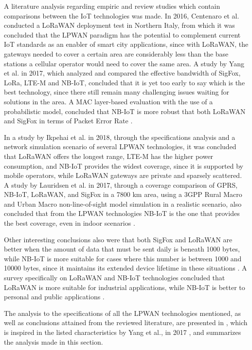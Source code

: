 A literature analysis regarding empiric and review studies which contain comparisons between the IoT technologies was made. In 2016, Centenaro et al. conducted a LoRaWAN deployment test in Northern Italy, from which it was concluded that the LPWAN paradigm has the potential to complement current IoT standards as an enabler of smart city applications, since with LoRaWAN, the gateways needed to cover
a certain area are considerably less than the base stations a cellular operator would need to cover the same area. A study by Yang et al. in 2017, which analyzed and compared the effective bandwidth of SigFox, LoRa, LTE-M and NB-IoT, concluded that it is yet too early to say which is the best technology, since there still remain many challenging issues waiting for solutions in the area. A \ac{MAC} layer-based evaluation with the use of a probabilistic model, concluded that NB-IoT is more robust that both LoRaWAN and SigFox in terms of Packet Error Rate \cite{Mroue2018}.

In a study by Ikpehai et al. in 2018, through the specifications analysis and a network simulation scenario of several LPWAN technologies, it was concluded that LoRaWAN offers the longest range, LTE-M has the higher power consumption, and NB-IoT provides the widest coverage, since it is supported by mobile operators, while LoRaWAN gateways are private and sparsely scattered. A study by Lauridsen et al. in 2017, through a coverage comparison of GPRS, NB-IoT, LoRaWAN, and SigFox in a 7800 km area, using a 3GPP Rural Macro and Urban Macro non-line-of-sight model simulation in a realistic scenario, also concluded that from the LPWAN technologies NB-IoT is the one that provides the best coverage, even in indoor scenarios \cite{Ikpehai2018}.

Other interesting conclusions also were that both SigFox and LoRaWAN are better when the amount of data that must be sent daily is beneath 1000 bytes, while NB-IoT is more suitable for cases where this number is between 1000 and 10000 bytes, since it maintains its extended device lifetime in these situations \cite{Finnegan2018}. A survey specifically on LoRaWAN and NB-IoT technologies concluded that LoRaWAN is more suitable for industrial applications, while NB-IoT is better to personal and public applications \cite{Zanella2016}.

The analysis to the specifications of all the LPWAN technologies mentioned, as well as conclusions attained from the reviewed literature, are presented in , which is inspired in the listed characteristics by Yang et al., in 2017 \cite{Yang2017}, and summarizes the analysis made in this section.


